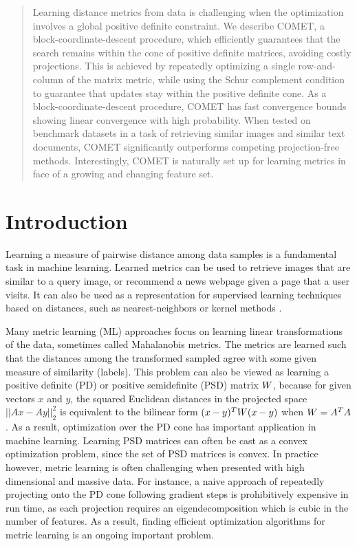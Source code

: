 \documentclass{article}
\begin{document}

\begin{abstract} 
Learning distance metrics from data is challenging when the optimization involves a global positive definite constraint. We describe COMET, a block-coordinate-descent procedure, which efficiently guarantees that the search remains within the cone of positive definite matrices, avoiding costly projections. 
This is achieved by repeatedly optimizing a single row-and-column of the matrix metric, while using the Schur complement condition to guarantee that updates stay within the positive definite cone. As a block-coordinate-descent procedure, COMET has fast convergence bounds showing linear convergence with high probability. When tested on benchmark datasets in a task of retrieving similar images and similar text documents, COMET significantly outperforms competing projection-free methods. Interestingly, COMET is naturally set up for learning metrics in face of a growing and changing feature set.
\end{abstract} 

\section{Introduction}
Learning a measure of pairwise distance among data samples is a fundamental task in machine learning. Learned metrics can be used to retrieve images that are similar to a query image, or recommend a news webpage given a page that a user visits. It can also be used as a representation for supervised learning techniques based on distances, such as nearest-neighbors or kernel methods \cite{kulis2012survey}. 

Many metric learning (ML) approaches focus on learning linear transformations of the data, sometimes called Mahalanobis metrics. The metrics are learned such that the distances among the transformed sampled agree with some given measure of similarity (labels). This problem can also be viewed as learning a positive definite (PD) or positive semidefinite (PSD) matrix ${W}$, because for given vectors $x$ and $y$, the squared Euclidean distances in the projected space $||Ax-Ay||^2_2$ is equivalent to the bilinear form  $(x-y)^T{W}(x-y)$ when  ${W}=A^TA$. As a result, optimization over the PD cone has important application in machine learning. 
Learning PSD matrices can often be cast as a convex optimization problem, since the set of PSD matrices is convex. In practice however, metric learning is often challenging  when presented with high dimensional and massive data. For instance, a naive approach of repeatedly projecting onto the PD cone following gradient steps is prohibitively expensive in run time, as each projection requires an eigendecomposition which is cubic in the number of features. As a result, finding efficient optimization algorithms for metric learning is an ongoing important problem.
\end{document}
